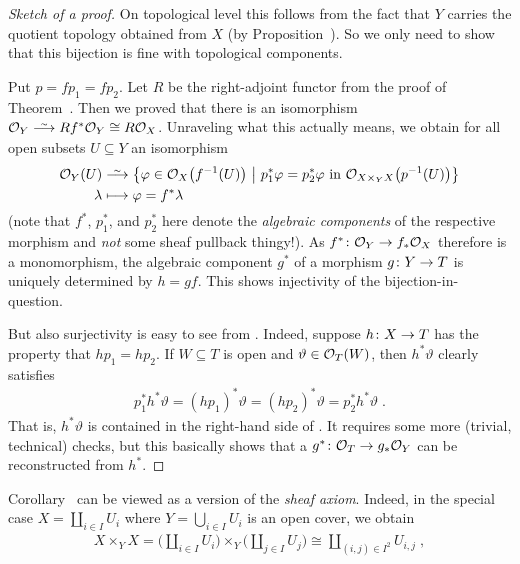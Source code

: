 \documentclass[a4paper,parskip=half,numbers=enddot, DIV=12]{scrreprt}
\begin{document}
\begin{proof}[Sketch of a proof]
	On topological level this follows from the fact that $Y$ carries the quotient topology obtained from $X$ (by Proposition~). So we only need to show that this bijection is fine with topological components. 
	
	Put $p=f p_1=f p_2$. Let $R$ be the right-adjoint functor from the proof of Theorem~. Then we proved that there is an isomorphism $\Oo_Y\isomorphism Rf^*\Oo_Y\cong R\Oo_X$. Unraveling what this actually means, we obtain for all open subsets $U\subseteq Y$ an isomorphism
	\begin{align}\lbl{eq:OYcongROX}
		\begin{split}
			\Oo_Y(U)&\isomorphism \left\{\phi\in\Oo_X\big(f^{-1}(U)\big)\st  p_1^*\phi= p_2^*\phi\text{ in }\Oo_{X\times_YX}\big(p^{-1}(U)\big)\right\}\\
			\lambda&\longmapsto \phi=f^*\lambda
		\end{split}		
	\end{align}
	(note that $f^*$, $ p_1^*$, and $ p_2^*$ here denote the \emph{algebraic components} of the respective morphism and \emph{not} some sheaf pullback thingy!). As $f^*\colon\Oo_Y\morphism f_*\Oo_X$ therefore is a monomorphism, the algebraic component $g^*$ of a morphism $g\colon Y\morphism T$ is uniquely determined by $h=gf$. This shows injectivity of the bijection-in-question.
	
	But also surjectivity is easy to see from . Indeed, suppose $h\colon X\morphism T$ has the property that $h p_1=h p_2$. If $W\subseteq T$ is open and $\vartheta\in\mathcal{O}_T(W)$, then $h^*\vartheta$ clearly satisfies 
	\begin{align*}
		 p_1^*h^*\vartheta=(h p_1)^*\vartheta=(h p_2)^*\vartheta= p_2^*h^*\vartheta\;.
	\end{align*}
	That is, $h^*\vartheta$ is contained in the right-hand side of . It requires some more (trivial, technical) checks, but this basically shows that a $g^*\colon \Oo_T\morphism g_*\Oo_Y$ can be reconstructed from $h^*$.
\end{proof}
Corollary~ can be viewed as a version of the \emph{sheaf axiom}. Indeed, in the special case $X=\coprod_{i\in I}U_i$ where $Y=\bigcup_{i\in I} U_i$ is an open cover, we obtain
\begin{align*}
	X\times_YX=\bigg(\coprod_{i\in I}U_i\bigg)\times_Y\bigg(\coprod_{j\in I}U_j\bigg)\cong\coprod_{(i,j)\in I^2}U_{i,j}\;,
\end{align*}
\end{document}
